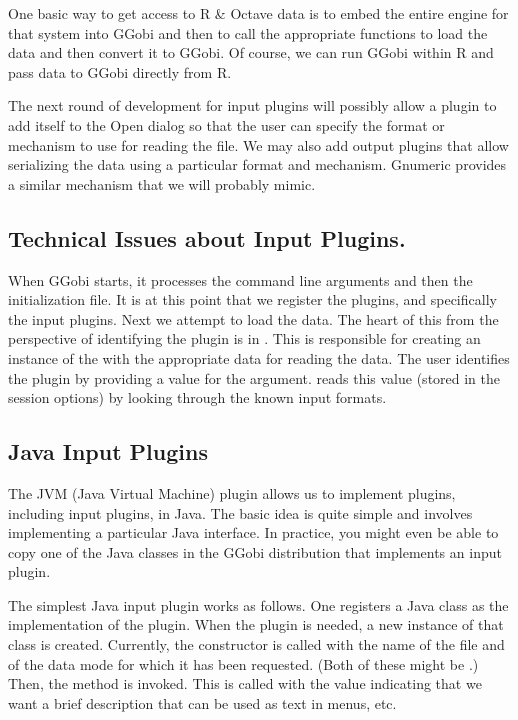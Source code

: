 \documentclass{article}
\def\file#1{\href{#1}{\Escape{#1}}}
\begin{document}
One basic way to get access to R \& Octave data is to embed the entire
engine for that system into GGobi and then to call the appropriate
functions to load the data and then convert it to GGobi.  Of course,
we can run GGobi within R and pass data to GGobi directly from R.


The next round of development for input plugins will possibly allow a
plugin to add itself to the Open dialog so that the user can specify
the format or mechanism to use for reading the file.  We may also add
output plugins that allow serializing the data using a particular
format and mechanism. Gnumeric provides a similar mechanism that we
will probably mimic.


\subsection{Technical Issues about Input Plugins.}
When GGobi starts, it processes the command line arguments and then the
initialization file.  It is at this point that we register the
plugins, and specifically the input plugins.  Next we attempt to load
the data.  The heart of this from the perspective of identifying the
plugin is  in \file{make_ggobi.c}.  This is
responsible for creating an instance of the 
with the appropriate data for reading the data.  The user identifies
the plugin by providing a value for the  argument.
 reads this value (stored in the session
options) by looking through the known input formats.

\subsection{Java Input Plugins}

The JVM (Java Virtual Machine) plugin allows us to implement plugins,
including input plugins, in Java.  The basic idea is quite simple and
involves implementing a particular Java interface.
In practice, you might even be able to copy one of the Java
classes in the GGobi distribution that implements an input plugin.

The simplest Java input plugin works as follows.  One registers a Java
class as the implementation of the plugin. When the plugin is needed,
a new instance of that class is created.  Currently, the constructor
is called with the name of the file and of the data mode for which it
has been requested. (Both of these might be \JNull.)  Then, the
 method is invoked.  This is called with
the value \JTrue{} indicating that we want a brief description that
can be used as text in menus, etc.
\end{document}
